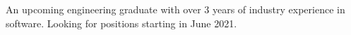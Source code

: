 


\begin{cvparagraph}


{An upcoming engineering graduate with over 3 years of industry experience in software. Looking for positions starting in June 2021.}


\end{cvparagraph}
\vspace{-4mm}